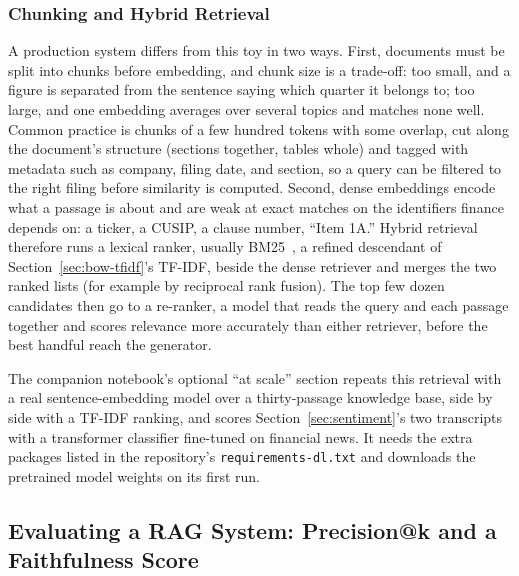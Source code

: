 \documentclass[../ai_in_finance]{subfiles}
\begin{document}
\subsubsection*{Chunking and Hybrid Retrieval}

A production system differs from this toy in two ways. First, documents must be split into chunks before embedding, and chunk size is a trade-off: too small, and a figure is separated from the sentence saying which quarter it belongs to; too large, and one embedding averages over several topics and matches none well. Common practice is chunks of a few hundred tokens with some overlap, cut along the document's structure (sections together, tables whole) and tagged with metadata such as company, filing date, and section, so a query can be filtered to the right filing before similarity is computed. Second, dense embeddings encode what a passage is about and are weak at exact matches on the identifiers finance depends on: a ticker, a CUSIP, a clause number, ``Item 1A.'' Hybrid retrieval therefore runs a lexical ranker, usually BM25~\parencite{robertson2009probabilistic}, a refined descendant of Section~\ref{sec:bow-tfidf}'s TF-IDF, beside the dense retriever and merges the two ranked lists (for example by reciprocal rank fusion). The top few dozen candidates then go to a re-ranker, a model that reads the query and each passage together and scores relevance more accurately than either retriever, before the best handful reach the generator.

The companion notebook's optional ``at scale'' section repeats this retrieval with a real sentence-embedding model over a thirty-passage knowledge base, side by side with a TF-IDF ranking, and scores Section~\ref{sec:sentiment}'s two transcripts with a transformer classifier fine-tuned on financial news. It needs the extra packages listed in the repository's \texttt{requirements-dl.txt} and downloads the pretrained model weights on its first run.

\subsection{Evaluating a RAG System: Precision@k and a Faithfulness Score}
\label{sec:rag-evaluation}
\end{document}
